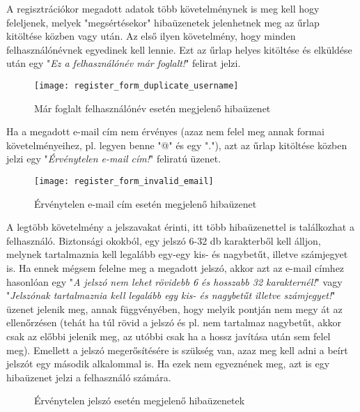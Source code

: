 A regisztrációkor megadott adatok több követelménynek is meg kell hogy feleljenek, melyek "megsértésekor" hibaüzenetek jelenhetnek meg az űrlap kitöltése közben vagy után. Az első ilyen követelmény, hogy minden felhasználónévnek egyedinek kell lennie. Ezt az űrlap helyes kitöltése és elküldése után egy "\textit{Ez a felhasználónév már foglalt!}" felirat jelzi.

\begin{figure}[H]
	\centering
	\texttt{[image: register\_form\_duplicate\_username]}
	\caption{Már foglalt felhasználónév esetén megjelenő hibaüzenet}
	\label{fig:register_form_duplicate_username}
\end{figure}

Ha a megadott e-mail cím nem érvényes (azaz nem felel meg annak formai követelményeihez, pl. legyen benne "@" és egy "."), azt az űrlap kitöltése közben jelzi egy "\textit{Érvénytelen e-mail cím!}" feliratú üzenet.

\begin{figure}[H]
	\centering
	\texttt{[image: register\_form\_invalid\_email]}
	\caption{Érvénytelen e-mail cím esetén megjelenő hibaüzenet}
	\label{fig:register_form_invalid_email}
\end{figure}

A legtöbb követelmény a jelszavakat érinti, itt több hibaüzenettel is találkozhat a felhasználó. Biztonsági okokból, egy jelszó 6-32 db karakterből kell álljon, melynek tartalmaznia kell legalább egy-egy kis- és nagybetűt, illetve számjegyet is. Ha ennek mégsem felelne meg a megadott jelszó, akkor azt az e-mail címhez hasonlóan egy "\textit{A jelszó nem lehet rövidebb 6 és hosszabb 32 karakternél!}" vagy "\textit{Jelszónak tartalmaznia kell legalább egy kis- és nagybetűt illetve számjegyet!}" üzenet jelenik meg, annak függvényében, hogy melyik pontján nem megy át az ellenőrzésen (tehát ha túl rövid a jelszó és pl. nem tartalmaz nagybetűt, akkor csak az előbbi jelenik meg, az utóbbi csak ha a hossz javítása után sem felel meg). Emellett a jelszó megerősítésére is szükség van, azaz meg kell adni a beírt jelszót egy második alkalommal is. Ha ezek nem egyeznének meg, azt is egy hibaüzenet jelzi a felhasználó számára.

\begin{figure}[H]
	\centering
	\hspace{5pt}
	\hspace{5pt}
	\caption{Érvénytelen jelszó esetén megjelenő hibaüzenetek}
	\label{fig:register_form_invalid_password}
\end{figure}

